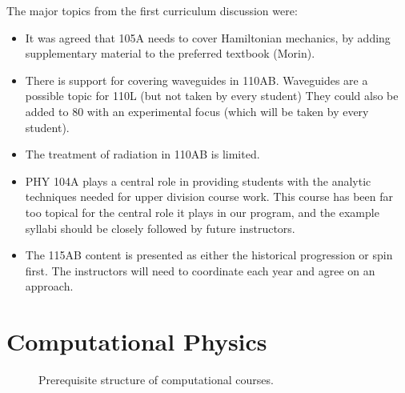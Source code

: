 \documentclass[12pt]{article}
\begin{document}
The major topics from the first curriculum discussion were:
\begin{itemize}
 \item It was agreed that 105A needs to cover Hamiltonian mechanics, by
   adding supplementary material to the preferred textbook (Morin).
 \item There is support for covering waveguides in 110AB.
   Waveguides are a possible topic for 110L (but not taken by every
   student) They could also be added to 80 with an experimental focus
   (which will be taken by every student).
 \item The treatment of radiation in 110AB is limited.   
 \item PHY 104A plays a central role in providing students with the
   analytic techniques needed for upper division course work.  This
   course has been far too topical for the central role it plays in
   our program, and the example syllabi should be closely followed by
   future instructors.
 \item The 115AB content is presented as either the historical
   progression or spin first.  The instructors will need to coordinate
   each year and agree on an approach.
\end{itemize}

\section{Computational Physics}
\label{sec:computing}

\begin{figure}
\begin{center}

\caption{\label{fig:comps} Prerequisite structure of computational courses.}

\end{center}
\end{figure}
\end{document}
